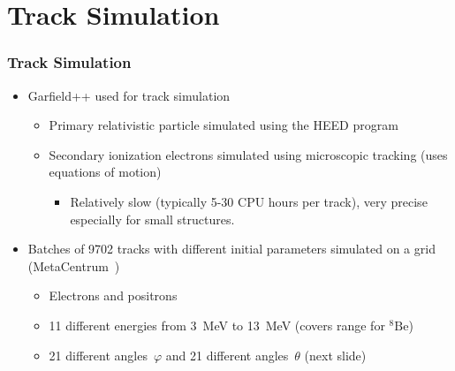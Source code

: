 \documentclass{beamer}
\begin{document}
	\section{Track Simulation}
	\begin{frame}
		\frametitle{Track Simulation}
		\begin{itemize}
			\item Garfield++ used for track simulation
			\begin{itemize}
				\item Primary relativistic particle simulated using the HEED program~\cite{heed}
				\item Secondary ionization electrons simulated using microscopic tracking (uses equations of motion)
				\begin{itemize}\item Relatively slow (typically 5-30 CPU hours per track), very precise especially for small structures.  \end{itemize}
			\end{itemize}
			\item Batches of 9702 tracks with different initial parameters simulated on a grid (MetaCentrum~\cite{meta})
			\begin{itemize}
				\item Electrons and positrons
				\item 11 different energies from 3~MeV to 13~MeV (covers range for $ {}^8\text{Be} $)
				\item 21 different angles~$\varphi$ and 21 different angles~$\theta$ (next slide)
			\end{itemize}
		\end{itemize}
	\end{frame}
	
\end{document}
